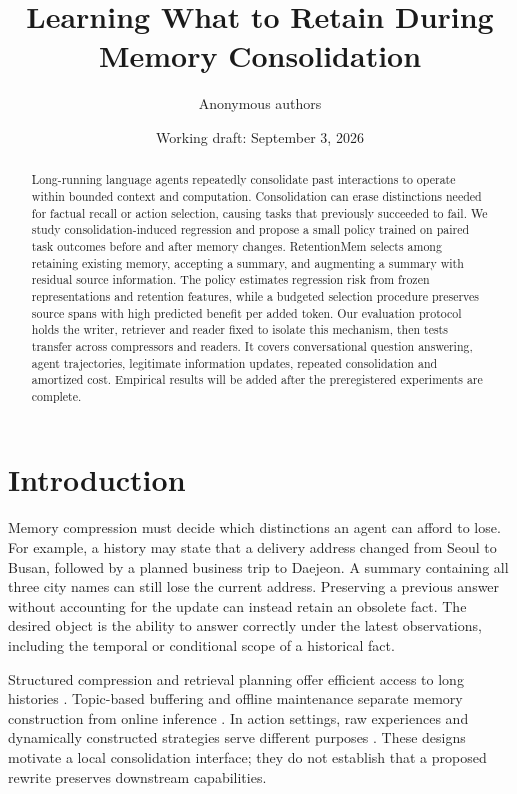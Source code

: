 \documentclass[11pt]{article}
\title{Learning What to Retain During Memory Consolidation}
\author{Anonymous authors}
\date{Working draft: September 3, 2026}
\newcommand{\method}{RetentionMem}
\begin{document}
\maketitle
\begin{abstract}
Long-running language agents repeatedly consolidate past interactions to operate
within bounded context and computation. Consolidation can erase distinctions
needed for factual recall or action selection, causing tasks that previously
succeeded to fail. We study consolidation-induced regression and propose a small
policy trained on paired task outcomes before and after memory changes.
\method{} selects among retaining existing memory, accepting a summary, and
augmenting a summary with residual source information. The policy estimates
regression risk from frozen representations and retention features, while a
budgeted selection procedure preserves source spans with high predicted benefit
per added token. Our evaluation protocol holds the writer, retriever and reader
fixed to isolate this mechanism, then tests transfer across compressors and
readers. It covers conversational question answering, agent trajectories,
legitimate information updates, repeated consolidation and amortized cost.
Empirical results will be added after the preregistered experiments are complete.
\end{abstract}

\section{Introduction}
Memory compression must decide which distinctions an agent can afford to lose.
For example, a history may state that a delivery address changed from Seoul to
Busan, followed by a planned business trip to Daejeon. A summary containing all
three city names can still lose the current address. Preserving a previous answer
without accounting for the update can instead retain an obsolete fact. The desired
object is the ability to answer correctly under the latest observations, including
the temporal or conditional scope of a historical fact.

Structured compression and retrieval planning offer efficient access to long
histories \cite{simplemem}. Topic-based buffering and offline maintenance separate
memory construction from online inference \cite{lightmem}. In action settings,
raw experiences and dynamically constructed strategies serve different purposes
\cite{adamem}. These designs motivate a local consolidation interface; they do
not establish that a proposed rewrite preserves downstream capabilities.
\end{document}
